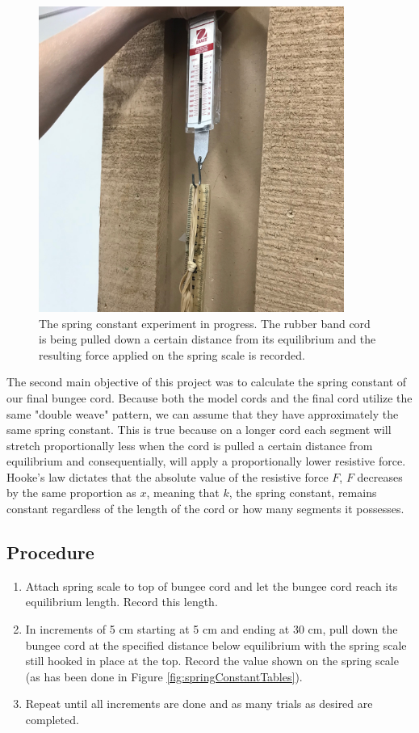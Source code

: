 \documentclass[12pt]{article}
\begin{document}
\begin{figure}[h]
    \centering
    \includegraphics[height=10cm]{springConstantExperiment}
    \caption{The spring constant experiment in progress. The rubber band cord is being pulled down a certain distance from its equilibrium and the resulting force applied on the spring scale is recorded.}
    \label{fig:springConstantExperiment}
\end{figure}

The second main objective of this project was to calculate the spring constant of our final bungee cord. Because both the model cords and the final cord utilize the same "double weave" pattern, we can assume that they have approximately the same spring constant. This is true because on a longer cord each segment will stretch proportionally less when the cord is pulled a certain distance from equilibrium and consequentially, will apply a proportionally lower resistive force. Hooke's law dictates that the absolute value of the resistive force $F$, $F$ decreases by the same proportion as $x$, meaning that $k$, the spring constant, remains constant regardless of the length of the cord or how many segments it possesses. 

\subsection{Procedure}

\begin{enumerate}
    \item Attach spring scale to top of bungee cord and let the bungee cord reach its equilibrium length. Record this length.
    \item In increments of 5 cm starting at 5 cm and ending at 30 cm, pull down the bungee cord at the specified distance below equilibrium with the spring scale still hooked in place at the top. Record the value shown on the spring scale (as has been done in Figure \ref{fig:springConstantTables}).
    \item Repeat until all increments are done and as many trials as desired are completed.
\end{enumerate}
\end{document}
